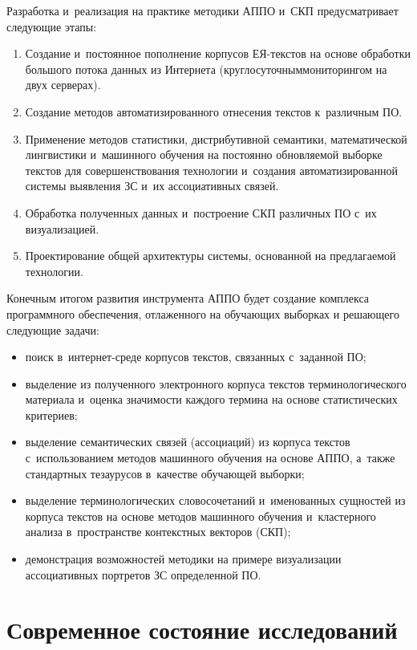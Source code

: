 \begin{multicols}{2}
     Разработка и~реализация на практике методики АППО и~СКП
предусматривает следующие этапы:
     \begin{enumerate}[1.]
     \item  Создание и~постоянное пополнение кор\-пу\-сов
ЕЯ-текс\-тов на основе обработки большого
потока данных из Интернета (круглосуточным\linebreak мониторингом на двух
серверах).
     \item Создание методов автоматизированного отнесения текстов к~различным ПО.
     \item Применение методов статистики, дистрибутивной семантики,
математической лингвистики и~машинного обучения на постоянно
об\-нов\-ля\-емой выборке текстов для совершенствования технологии и~создания
автоматизированной сис\-те\-мы выявления ЗС и~их ассоциативных связей.
     \item Обработка полученных данных и~построение СКП различных
ПО с~их визуализацией.
     \item Проектирование общей архитектуры системы, основанной на
предлагаемой технологии.
     \end{enumerate}

     Конечным итогом развития инструмента \mbox{АППО} будет создание
комплекса программного обеспечения, отлаженного на обучающих выборках
и решающего следующие задачи:
     \begin{itemize}
\item поиск в~интернет-сре\-де корпусов текстов, связанных с~заданной
ПО;
\item выделение из полученного электронного корпуса текстов
терминологического материала и~оценка значимости каждого термина на
основе статистических критериев;
\item выделение семантических связей (ассоциаций) из корпуса текстов с~использованием методов машинного обучения на основе АППО, а~также
стандартных тезаурусов в~качестве обучающей выборки;
\item выделение терминологических словосочетаний и~именованных
сущностей из корпуса текстов на основе методов машинного обучения и~клас\-тер\-но\-го анализа в~пространстве контекстных векторов (СКП);
\item демонстрация возможностей методики на примере визуализации
ассоциативных портретов ЗС определенной ПО.
\end{itemize}

    \section{Современное состояние исследований}


\end{multicols}
